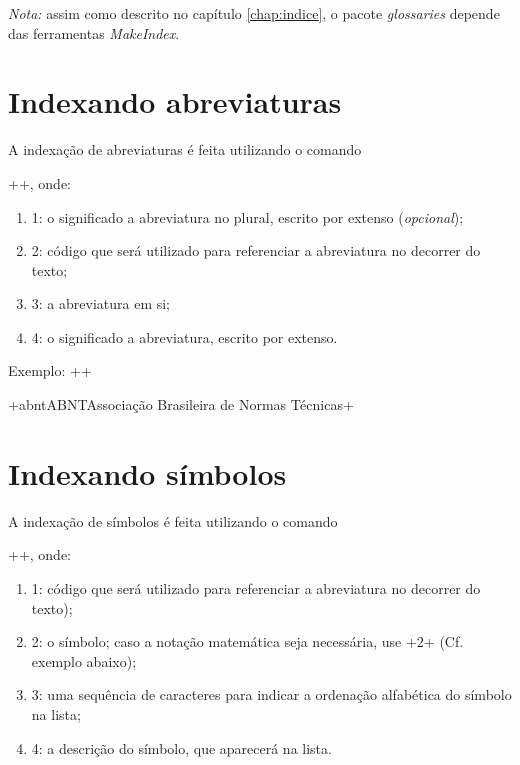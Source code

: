 \documentclass[xindy,rascunho]{fei}
\begin{document}
\begin{teorema}
	\emph{Nota:} assim como descrito no capítulo \ref{chap:indice}, o pacote \emph{glossaries} depende das ferramentas \emph{MakeIndex}.
	
	\section{Indexando abreviaturas}
	
	A indexação de abreviaturas é feita utilizando o comando
	
	\latexinline++, onde:
	
	\begin{enumerate}
	\item 1: o significado a abreviatura no plural, escrito por extenso (\emph{opcional});
	\item 2: código que será utilizado para referenciar a abreviatura no decorrer do texto;
	\item 3: a abreviatura em si;
	\item 4: o significado a abreviatura, escrito por extenso.
	\end{enumerate}
	
	Exemplo: \latexinline+\newacronym[longplural=Associações+
	
			 \latexinline+Brasileiras de Normas Técnicas]+
			 
			 \latexinline+{abnt}{ABNT}{Associação Brasileira de Normas Técnicas}+
			 
	\section{Indexando símbolos}
	
	A indexação de símbolos é feita utilizando o comando
	
	\latexinline++, onde:
	
	\begin{enumerate}
	\item 1: código que será utilizado para referenciar a abreviatura no decorrer do texto);
	\item 2: o símbolo; caso a notação matemática seja necessária, use \latexinline+\ensuremath{2}+ (Cf. exemplo abaixo);
	\item 3: uma sequência de caracteres para indicar a ordenação alfabética do símbolo na lista;
	\item 4: a descrição do símbolo, que aparecerá na lista.
	\end{enumerate}
	

\end{teorema}
\end{document}
